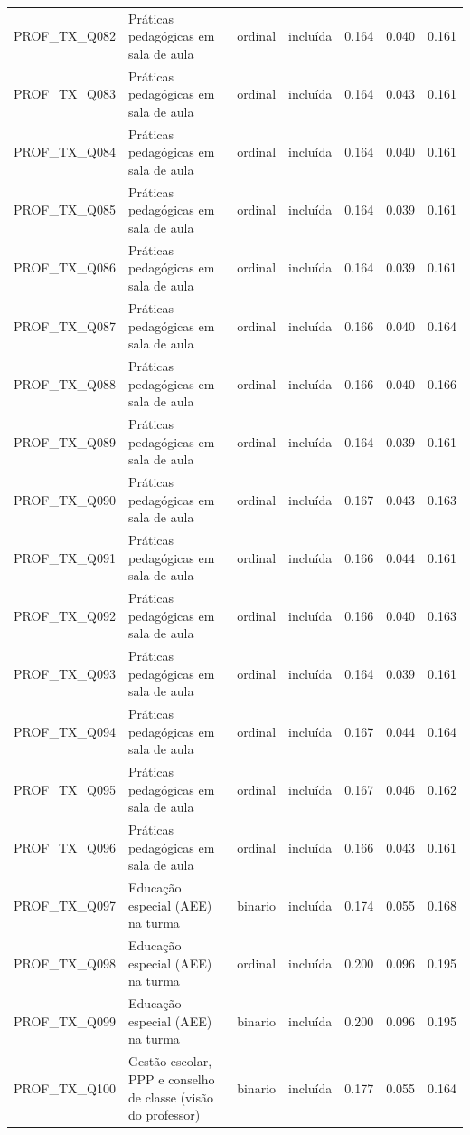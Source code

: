 \begin{tabular}{llllrrr}
PROF\_TX\_Q082 & Práticas pedagógicas em sala de aula & ordinal & incluída & 0.164 & 0.040 & 0.161 \\
PROF\_TX\_Q083 & Práticas pedagógicas em sala de aula & ordinal & incluída & 0.164 & 0.043 & 0.161 \\
PROF\_TX\_Q084 & Práticas pedagógicas em sala de aula & ordinal & incluída & 0.164 & 0.040 & 0.161 \\
PROF\_TX\_Q085 & Práticas pedagógicas em sala de aula & ordinal & incluída & 0.164 & 0.039 & 0.161 \\
PROF\_TX\_Q086 & Práticas pedagógicas em sala de aula & ordinal & incluída & 0.164 & 0.039 & 0.161 \\
PROF\_TX\_Q087 & Práticas pedagógicas em sala de aula & ordinal & incluída & 0.166 & 0.040 & 0.164 \\
PROF\_TX\_Q088 & Práticas pedagógicas em sala de aula & ordinal & incluída & 0.166 & 0.040 & 0.166 \\
PROF\_TX\_Q089 & Práticas pedagógicas em sala de aula & ordinal & incluída & 0.164 & 0.039 & 0.161 \\
PROF\_TX\_Q090 & Práticas pedagógicas em sala de aula & ordinal & incluída & 0.167 & 0.043 & 0.163 \\
PROF\_TX\_Q091 & Práticas pedagógicas em sala de aula & ordinal & incluída & 0.166 & 0.044 & 0.161 \\
PROF\_TX\_Q092 & Práticas pedagógicas em sala de aula & ordinal & incluída & 0.166 & 0.040 & 0.163 \\
PROF\_TX\_Q093 & Práticas pedagógicas em sala de aula & ordinal & incluída & 0.164 & 0.039 & 0.161 \\
PROF\_TX\_Q094 & Práticas pedagógicas em sala de aula & ordinal & incluída & 0.167 & 0.044 & 0.164 \\
PROF\_TX\_Q095 & Práticas pedagógicas em sala de aula & ordinal & incluída & 0.167 & 0.046 & 0.162 \\
PROF\_TX\_Q096 & Práticas pedagógicas em sala de aula & ordinal & incluída & 0.166 & 0.043 & 0.161 \\
PROF\_TX\_Q097 & Educação especial (AEE) na turma & binario & incluída & 0.174 & 0.055 & 0.168 \\
PROF\_TX\_Q098 & Educação especial (AEE) na turma & ordinal & incluída & 0.200 & 0.096 & 0.195 \\
PROF\_TX\_Q099 & Educação especial (AEE) na turma & binario & incluída & 0.200 & 0.096 & 0.195 \\
PROF\_TX\_Q100 & Gestão escolar, PPP e conselho de classe (visão do professor) & binario & incluída & 0.177 & 0.055 & 0.164 \\

\end{tabular}
